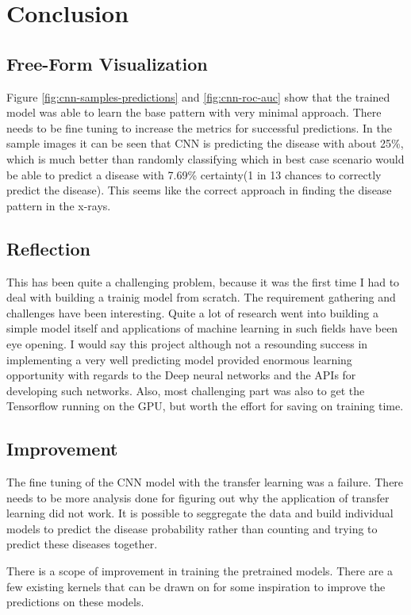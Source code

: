 \documentclass{article}
\begin{document}
    \section{Conclusion}

    \subsection{Free-Form Visualization}
    Figure \ref{fig:cnn-samples-predictions} and \ref{fig:cnn-roc-auc} show that the trained model was able to learn the base pattern with very minimal approach. There needs to be fine tuning to increase the metrics for successful predictions. In the sample images it can be seen that CNN is predicting the disease with about 25\%, which is much better than randomly classifying which in best case scenario would be able to predict a disease with 7.69\% certainty(1 in 13 chances to correctly predict the disease). This seems like the correct approach in finding the disease pattern in the x-rays.

    \subsection{Reflection}
    This has been quite a challenging problem, because it was the first time I had to deal with building a trainig model from scratch. The requirement gathering and challenges have been interesting. Quite a lot of research went into building a simple model itself and applications of machine learning in such fields have been eye opening. I would say this project although not a resounding success in implementing a very well predicting model provided enormous learning opportunity with regards to the Deep neural networks and the APIs for developing such networks. Also, most challenging part was also to get the Tensorflow running on the GPU, but worth the effort for saving on training time. 

    \subsection{Improvement}
    The fine tuning of the CNN model with the transfer learning was a failure. There needs to be more analysis done for figuring out why the application of transfer learning did not work. It is possible to seggregate the data and build individual models to predict the disease probability rather than counting and trying to predict these diseases together.

    There is a scope of improvement in training the pretrained models. There are a few existing kernels that can be drawn on for some inspiration to improve the predictions on these models.\cite{cardio-kaggle}
\end{document}
